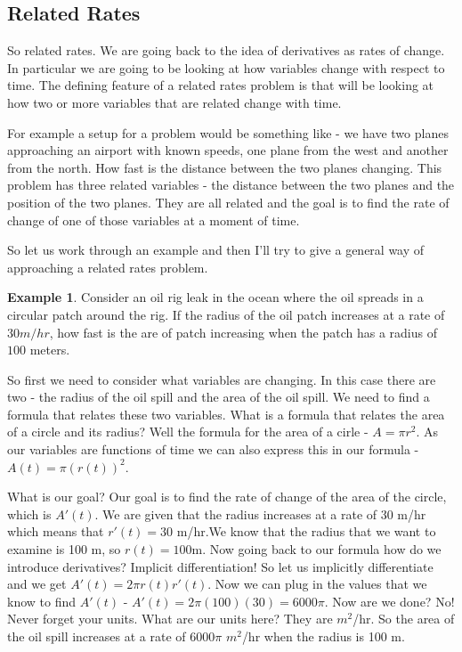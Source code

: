 \documentclass[12pt,reqno]{article}
\theoremstyle{definition}
\newtheorem*{Example}{Example}
\begin{document}
\subsection{Related Rates}

So related rates. We are going back to the idea of derivatives as rates of change. In particular we are going to be looking at how variables change with respect to time. The defining feature of a related rates problem is that will be looking at how two or more variables that are related change with time. 

For example a setup for a problem would be something like - we have two planes approaching an airport with known speeds, one plane from the west and another from the north. How fast is the distance between the two planes changing. This problem has three related variables - the distance between the two planes and the position of the two planes. They are all related and the goal is to find the rate of change of one of those variables at a moment of time. 

So let us work through an example and then I'll try to give a general way of approaching a related rates problem. 
\begin{Example}
	Consider an oil rig leak in the ocean where the oil spreads in a circular patch around the rig. If the radius of the oil patch increases at a rate of $30 m/hr$, how fast is the are of patch increasing when the patch has a radius of $100$ meters. 
	
	So first we need to consider what variables are changing. In this case there are two - the radius of the oil spill and the area of the oil spill. We need to find a formula that relates these two variables. What is a formula that relates the area of a circle and its radius? Well the formula for the area of a cirle - $A = \pi r^2$. As our variables are functions of time we can also express this in our formula - $A(t) = \pi (r(t))^2$.  
	
	What is our goal? Our goal is to find the rate of change of the area of the circle, which is $A'(t)$. We are given that the radius increases at a rate of 30 m/hr which means that $r'(t) = 30$ m/hr.We know that the radius that we want to examine is 100 m, so $r(t) = 100$m. Now going back to our formula how do we introduce derivatives? Implicit differentiation! So let us implicitly differentiate and we get $A'(t) = 2 \pi r(t) r'(t)$. Now we can plug in the values that we know to find $A'(t)$ - $A'(t) = 2 \pi (100)(30) = 6000\pi$. Now are we done? No! Never forget your units. What are our units here? They are $m^2$/hr. So the area of the oil spill increases at a rate of 6000$\pi$ $m^2$/hr when the radius is 100 m. 
\end{Example}
\end{document}
